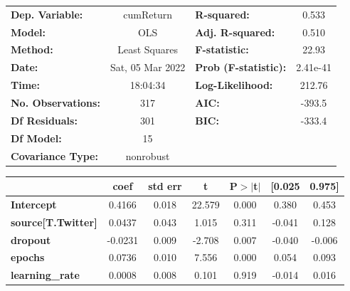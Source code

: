 \begin{center}
\begin{tabular}{lclc}
\toprule
\textbf{Dep. Variable:}              &    cumReturn     & \textbf{  R-squared:         } &     0.533   \\
\textbf{Model:}                      &       OLS        & \textbf{  Adj. R-squared:    } &     0.510   \\
\textbf{Method:}                     &  Least Squares   & \textbf{  F-statistic:       } &     22.93   \\
\textbf{Date:}                       & Sat, 05 Mar 2022 & \textbf{  Prob (F-statistic):} &  2.41e-41   \\
\textbf{Time:}                       &     18:04:34     & \textbf{  Log-Likelihood:    } &    212.76   \\
\textbf{No. Observations:}           &         317      & \textbf{  AIC:               } &    -393.5   \\
\textbf{Df Residuals:}               &         301      & \textbf{  BIC:               } &    -333.4   \\
\textbf{Df Model:}                   &          15      & \textbf{                     } &             \\
\textbf{Covariance Type:}            &    nonrobust     & \textbf{                     } &             \\
\bottomrule
\end{tabular}
\begin{tabular}{lcccccc}
                                     & \textbf{coef} & \textbf{std err} & \textbf{t} & \textbf{P$> |$t$|$} & \textbf{[0.025} & \textbf{0.975]}  \\
\midrule
\textbf{Intercept}                   &       0.4166  &        0.018     &    22.579  &         0.000        &        0.380    &        0.453     \\
\textbf{source[T.Twitter]}           &       0.0437  &        0.043     &     1.015  &         0.311        &       -0.041    &        0.128     \\
\textbf{dropout}                     &      -0.0231  &        0.009     &    -2.708  &         0.007        &       -0.040    &       -0.006     \\
\textbf{epochs}                      &       0.0736  &        0.010     &     7.556  &         0.000        &        0.054    &        0.093     \\
\textbf{learning\_rate}              &       0.0008  &        0.008     &     0.101  &         0.919        &       -0.014    &        0.016     \\

\end{tabular}
\end{center}
